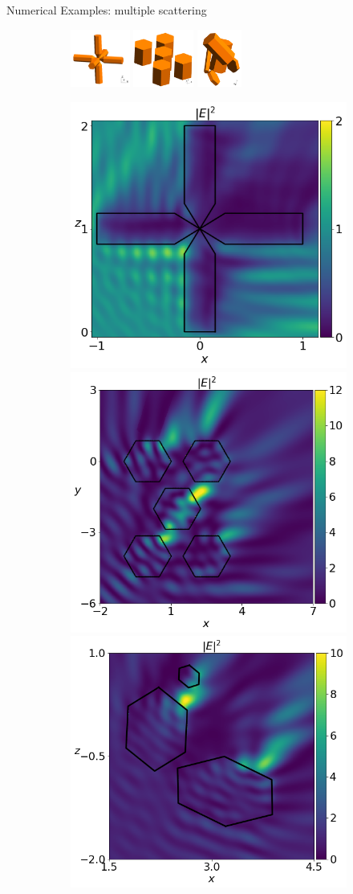 \documentclass[12pt]{beamer}
\begin{document}
\begin{frame}{Numerical Examples: multiple scattering}
    \begin{figure}
\centering
    \begin{subfigure}[t]{\textwidth}
        \centering
        \includegraphics[height = 1.9cm]{Figures/6rosettes.png} \hspace{2cm}%
        \includegraphics[height = 1.9cm]{Figures/5crystals.png} \hspace{3cm}%
        \includegraphics[height = 1.9cm]{Figures/5crystals_random.png}
    \end{subfigure}
    \begin{subfigure}[t]{\textwidth}
        \centering
        \includegraphics[width = 0.3 \textwidth]{Figures/6rosettes_result.png}
        \includegraphics[width = 0.3 \textwidth]{Figures/5crystals_result.png}
        \includegraphics[width = 0.3 \textwidth]{Figures/5crystals_random_result.png}
    \end{subfigure}
\end{figure}


\end{frame}
\end{document}
